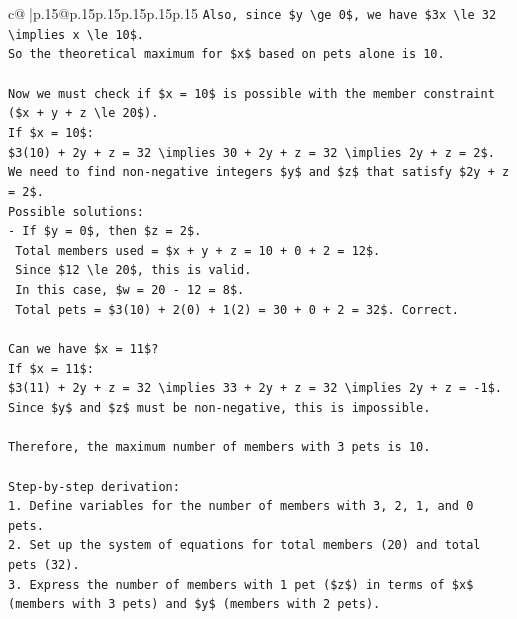\documentclass{article}
\begin{document}
{\begin{supertabular}{c@{$\;$}|p{.15\linewidth}@{}p{.15\linewidth}p{.15\linewidth}p{.15\linewidth}p{.15\linewidth}p{.15\linewidth}}
{{{\texttt{Also, since \$y \textbackslash{}ge 0\$, we have \$3x \textbackslash{}le 32 \textbackslash{}implies x \textbackslash{}le 10\$.} \\
\texttt{So the theoretical maximum for \$x\$ based on pets alone is 10.} \\
\\ 
\texttt{Now we must check if \$x = 10\$ is possible with the member constraint (\$x + y + z \textbackslash{}le 20\$).} \\
\texttt{If \$x = 10\$:} \\
\texttt{\$3(10) + 2y + z = 32 \textbackslash{}implies 30 + 2y + z = 32 \textbackslash{}implies 2y + z = 2\$.} \\
\texttt{We need to find non{-}negative integers \$y\$ and \$z\$ that satisfy \$2y + z = 2\$.} \\
\texttt{Possible solutions:} \\
\texttt{{-} If \$y = 0\$, then \$z = 2\$.} \\
\texttt{  Total members used = \$x + y + z = 10 + 0 + 2 = 12\$.} \\
\texttt{  Since \$12 \textbackslash{}le 20\$, this is valid.} \\
\texttt{  In this case, \$w = 20 {-} 12 = 8\$.} \\
\texttt{  Total pets = \$3(10) + 2(0) + 1(2) = 30 + 0 + 2 = 32\$. Correct.} \\
\\ 
\texttt{Can we have \$x = 11\$?} \\
\texttt{If \$x = 11\$:} \\
\texttt{\$3(11) + 2y + z = 32 \textbackslash{}implies 33 + 2y + z = 32 \textbackslash{}implies 2y + z = {-}1\$.} \\
\texttt{Since \$y\$ and \$z\$ must be non{-}negative, this is impossible.} \\
\\ 
\texttt{Therefore, the maximum number of members with 3 pets is 10.} \\
\\ 
\texttt{Step{-}by{-}step derivation:} \\
\texttt{1. Define variables for the number of members with 3, 2, 1, and 0 pets.} \\
\texttt{2. Set up the system of equations for total members (20) and total pets (32).} \\
\texttt{3. Express the number of members with 1 pet (\$z\$) in terms of \$x\$ (members with 3 pets) and \$y\$ (members with 2 pets).} \\
}}}
\end{supertabular}}
\end{document}
